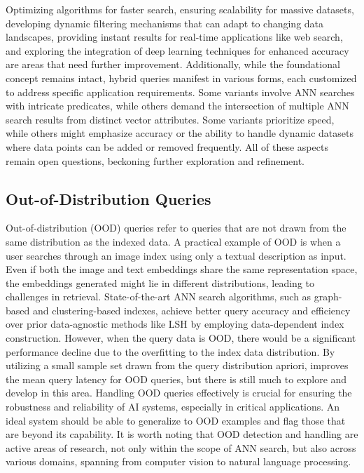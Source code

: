 \documentclass[11pt]{article}
\begin{document}
Optimizing algorithms for faster search, ensuring scalability for massive datasets, developing dynamic filtering mechanisms that can adapt to changing data landscapes, providing instant results for real-time applications like web search, and exploring the integration of deep learning techniques for enhanced accuracy are areas that need further improvement. Additionally, while the foundational concept remains intact, hybrid queries manifest in various forms, each customized to address specific application requirements. Some variants involve ANN searches with intricate predicates, while others demand the intersection of multiple ANN search results from distinct vector attributes. Some variants prioritize speed, while others might emphasize accuracy or the ability to handle dynamic datasets where data points can be added or removed frequently. All of these aspects remain open questions, beckoning further exploration and refinement.


\subsection{Out-of-Distribution Queries}
Out-of-distribution (OOD) queries refer to queries that are not drawn from the same distribution as the indexed data. 
A practical example of OOD is when a user searches through an image index using only a textual description as input. Even if both the image and text embeddings share the same representation space, the embeddings generated might lie in different distributions, leading to challenges in retrieval. State-of-the-art ANN search algorithms, such as graph-based and clustering-based indexes, achieve better query accuracy and efficiency over prior data-agnostic methods like LSH by employing data-dependent index construction. However, when the query data is OOD, there would be a significant performance decline due to the overfitting to the index data distribution.  By utilizing a small sample set drawn from the query distribution apriori, \cite{DBLP:journals/corr/abs-2211-12850} improves the mean query latency for OOD queries, but there is still much to explore and develop in this area. Handling OOD queries effectively is crucial for ensuring the robustness and reliability of AI systems, especially in critical applications. 
An ideal system should be able to generalize to OOD examples and flag those that are beyond its capability. It is  worth noting that OOD detection and handling are active areas of research, not only within the scope of ANN search, but also across various domains, spanning from computer vision to natural language processing.
\end{document}

